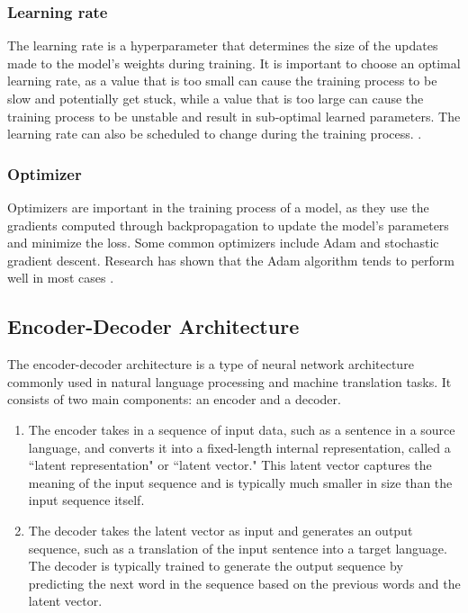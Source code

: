 \documentclass{book}
\begin{document}
	\subsubsection{Learning rate}
	
	The learning rate is a hyperparameter that determines the size of the updates made to the model's weights during training. It is important to choose an optimal learning rate, as a value that is too small can cause the training process to be slow and potentially get stuck, while a value that is too large can cause the training process to be unstable and result in sub-optimal learned parameters. The learning rate can also be scheduled to change during the training process. \cite{senior2013empirical}. 
	
	
	\subsubsection{Optimizer}
	
	Optimizers are important in the training process of a model, as they use the gradients computed through backpropagation to update the model's parameters and minimize the loss. Some common optimizers include Adam and stochastic gradient descent. Research has shown that the Adam algorithm tends to perform well in most cases \cite{zaheer2019study}.
	
	\subsection{Encoder-Decoder Architecture}
	The encoder-decoder architecture is a type of neural network architecture commonly used in natural language processing and machine translation tasks. It consists of two main components: an encoder and a decoder.
	\begin{enumerate}
		\item The encoder takes in a sequence of input data, such as a sentence in a source language, and converts it into a fixed-length internal representation, called a ``latent representation" or ``latent vector." This latent vector captures the meaning of the input sequence and is typically much smaller in size than the input sequence itself.
		\item The decoder takes the latent vector as input and generates an output sequence, such as a translation of the input sentence into a target language. The decoder is typically trained to generate the output sequence by predicting the next word in the sequence based on the previous words and the latent vector.
	\end{enumerate}
	
\end{document}
